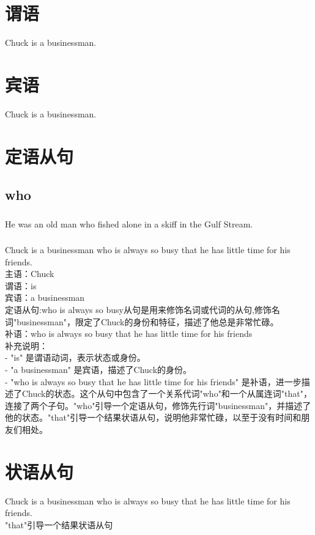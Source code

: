 \documentclass[12pt,twiside,a4paper]{ctexbook}
\numberwithin{chapter}{part}
\begin{document}
\section{谓语}
Chuck is a businessman.
\section{宾语}
Chuck is a businessman.
\section{定语从句}
\subsection{who}
\subsubsection{}
He was an old man who fished alone in a skiff in the Gulf Stream. 
\subsubsection{}
Chuck is a businessman who is always so busy that he has little time for his friends. \\
主语：Chuck\\
谓语：is\\
宾语：a businessman\\
定语从句:who is always so busy从句是用来修饰名词或代词的从句,修饰名词"businessman"，限定了Chuck的身份和特征，描述了他总是非常忙碌。\\
补语：who is always so busy that he has little time for his friends\\
补充说明：\\
- "is" 是谓语动词，表示状态或身份。\\
- "a businessman" 是宾语，描述了Chuck的身份。\\
- "who is always so busy that he has little time for his friends" 是补语，进一步描述了Chuck的状态。这个从句中包含了一个关系代词"who"和一个从属连词"that"，连接了两个子句。"who"引导一个定语从句，修饰先行词"businessman"，并描述了他的状态。"that"引导一个结果状语从句，说明他非常忙碌，以至于没有时间和朋友们相处。
\section{状语从句}
Chuck is a businessman who is always so busy that he has little time for his friends. \\
"that"引导一个结果状语从句
\end{document}

